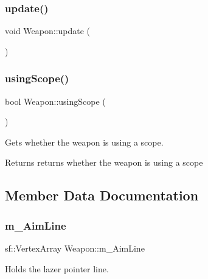 \mbox{\label{class_weapon_a1b3f76c5275b67f0bb8073157a27e736}} 
\subsubsection{\texorpdfstring{update()}{update()}}
{\footnotesize\ttfamily void Weapon\+::update (\begin{DoxyParamCaption}{ }\end{DoxyParamCaption})}

\mbox{\label{class_weapon_a5cc98ecbbf1b8132abe99df8871f0d33}} 
\subsubsection{\texorpdfstring{using\+Scope()}{usingScope()}}
{\footnotesize\ttfamily bool Weapon\+::using\+Scope (\begin{DoxyParamCaption}{ }\end{DoxyParamCaption})}



Gets whether the weapon is using a scope. 

\begin{DoxyReturn}{Returns}
returns whether the weapon is using a scope 
\end{DoxyReturn}


\subsection{Member Data Documentation}
\mbox{\label{class_weapon_a7b266850fb8ef8666f9f4d7d614dea26}} 
\subsubsection{\texorpdfstring{m\+\_\+\+Aim\+Line}{m\_AimLine}}
{\footnotesize\ttfamily sf\+::\+Vertex\+Array Weapon\+::m\+\_\+\+Aim\+Line\hspace{0.3cm}{\ttfamily [private]}}



Holds the lazer pointer line. 

